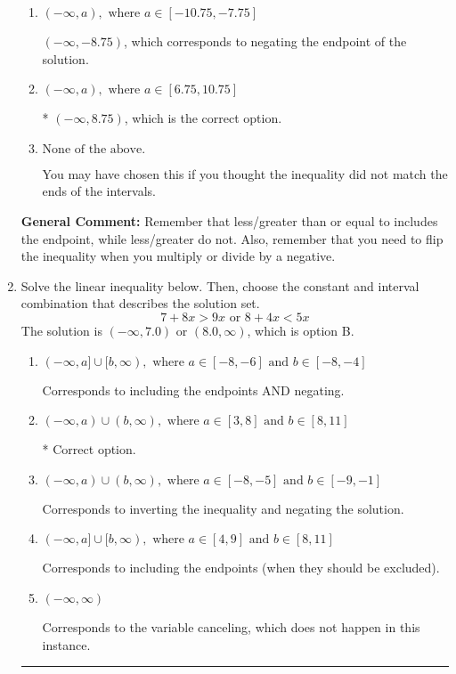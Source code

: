 \documentclass{extbook}[14pt]
\newcommand{\litem}[1]{\item #1

\rule{\textwidth}{0.4pt}}
\begin{document}
\begin{enumerate}
{\begin{enumerate}[label=\Alph*.]
 $(-8.75, \infty)$, which corresponds to switching the direction of the interval AND negating the endpoint. You likely did this if you did not flip the inequality when dividing by a negative as well as not moving values over to a side properly.
\item \( (-\infty, a), \text{ where } a \in [-10.75, -7.75] \)

 $(-\infty, -8.75)$, which corresponds to negating the endpoint of the solution.
\item \( (-\infty, a), \text{ where } a \in [6.75, 10.75] \)

* $(-\infty, 8.75)$, which is the correct option.
\item \( \text{None of the above}. \)

You may have chosen this if you thought the inequality did not match the ends of the intervals.
\end{enumerate}

\textbf{General Comment:} Remember that less/greater than or equal to includes the endpoint, while less/greater do not. Also, remember that you need to flip the inequality when you multiply or divide by a negative.
}
\litem{
Solve the linear inequality below. Then, choose the constant and interval combination that describes the solution set.
\[ 7 + 8 x > 9 x \text{ or } 8 + 4 x < 5 x \]The solution is \( (-\infty, 7.0) \text{ or } (8.0, \infty) \), which is option B.\begin{enumerate}[label=\Alph*.]
\item \( (-\infty, a] \cup [b, \infty), \text{ where } a \in [-8, -6] \text{ and } b \in [-8, -4] \)

Corresponds to including the endpoints AND negating.
\item \( (-\infty, a) \cup (b, \infty), \text{ where } a \in [3, 8] \text{ and } b \in [8, 11] \)

 * Correct option.
\item \( (-\infty, a) \cup (b, \infty), \text{ where } a \in [-8, -5] \text{ and } b \in [-9, -1] \)

Corresponds to inverting the inequality and negating the solution.
\item \( (-\infty, a] \cup [b, \infty), \text{ where } a \in [4, 9] \text{ and } b \in [8, 11] \)

Corresponds to including the endpoints (when they should be excluded).
\item \( (-\infty, \infty) \)

Corresponds to the variable canceling, which does not happen in this instance.
\end{enumerate}

}
\end{enumerate}
\end{document}
